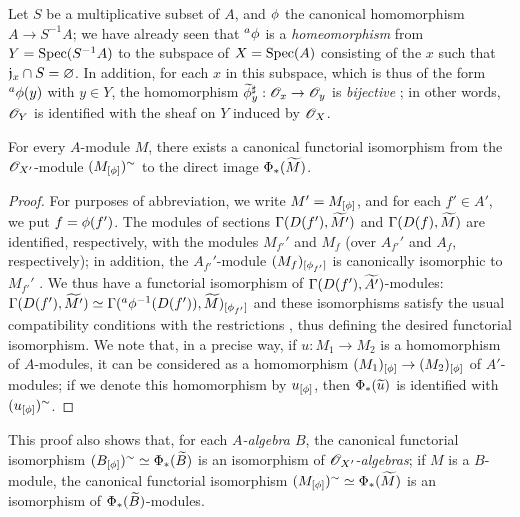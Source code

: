 \begin{exm}[1.6.2]
\label{1.1.6.2}
Let $S$ be a multiplicative subset of $A$, and $\phi$ the canonical homomorphism $A\to S^{-1}A$;
we have already seen  that ${}^a\phi$ is a \emph{homeomorphism} from $Y={\mathop{\mathrm{Spec}}\nolimits}(S^{-1}A)$ to the subspace of $X={\mathop{\mathrm{Spec}}\nolimits}(A)$ consisting of the $x$ such that $\mathfrak{j}_x\cap S=\varnothing$.
In addition, for each $x$ in this subspace, which is thus of the form ${}^a\phi(y)$ with $y\in Y$, the homomorphism $\wt{\vphi}_y^\sharp:\OO_x\to\OO_y$ is
\emph{bijective} ;
in other words, $\mathscr{O}_Y$ is identified with the sheaf on $Y$ induced by $\mathscr{O}_X$.
\end{exm}

\begin{prop}[1.6.3]
\label{1.1.6.3}
For every $A$-module $M$, there exists a canonical functorial isomorphism from the $\mathscr{O}_{X'}$-module $(M_{[\phi]})^\sim$ to the direct image $\Phi_*({\widetilde{M}})$.
\end{prop}

\begin{proof}
\label{proof-1.1.6.3}
For purposes of abbreviation, we write $M'=M_{[\phi]}$, and for each $f'\in A'$, we put $f=\phi(f')$.
The modules of sections $\Gamma(D(f'),{\widetilde{M'}})$ and $\Gamma(D(f),{\widetilde{M}})$ are identified, respectively, with the modules $M_{f'}'$ and $M_f$ (over $A_{f'}'$ and $A_f$, respectively);
in addition, the $A_{f'}'$-module $(M_f)_{[\phi_{f'}]}$ is canonically isomorphic to $M_{f'}'$ .
We thus have a functorial isomorphism of $\Gamma(D(f'),{\widetilde{A'}})$-modules: $\Gamma(D(f'),{\widetilde{M'}}) \simeq\Gamma({}^a\phi^{-1}(D(f')),{\widetilde{M}})_{[\phi_{f'}]}$ and these isomorphisms satisfy the usual compatibility conditions with the restrictions , thus defining the desired functorial isomorphism.
We note that, in a precise way, if $u:M_1\to M_2$ is a homomorphism of $A$-modules, it can be considered as a homomorphism $(M_1)_{[\vphi]}\to(M_2)_{[\vphi]}$ of $A'$-modules;
if we denote this homomorphism by $u_{[\phi]}$, then $\Phi_*({\widetilde{u}})$ is identified with $(u_{[\phi]})^\sim$.
\end{proof}

This proof also shows that, for each \emph{$A$-algebra $B$}, the canonical functorial isomorphism
$(B_{[\phi]})^\sim\simeq\Phi_*({\widetilde{B}})$ is an isomorphism of \emph{$\mathscr{O}_{X'}$-algebras};
if $M$ is a $B$-module, the canonical functorial isomorphism $(M_{[\phi]})^\sim\simeq\Phi_*({\widetilde{M}})$ is an isomorphism of $\Phi_*({\widetilde{B}})$-modules.

